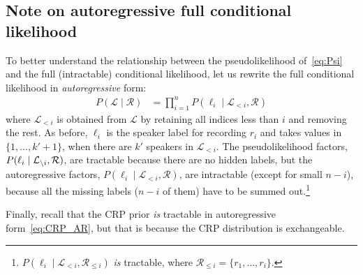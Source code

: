 \documentclass[a4paper,oneside,12pt,english]{report}
\def\Lset{\mathcal{L}}
\def\Rset{\mathcal{R}}
\begin{document}
\subsection{Note on autoregressive full conditional likelihood}
To better understand the relationship between the pseudolikelihood of~\eqref{eq:Psi} and the full (intractable) conditional likelihood, let us rewrite the full conditional likelihood in \emph{autoregressive} form:
\begin{align}
P(\Lset \mid \Rset) &= \prod_{i=1}^{n} P(\ell_i\mid\Lset_{< i},\Rset)
\end{align} 
where $\Lset_{< i}$ is obtained from $\Lset$ by retaining all indices less than $i$ and removing the rest. As before, $\ell_i$ is the speaker label for recording $r_i$ and takes values in $\{1,\ldots,k'+1\}$, when there are $k'$ speakers in $\Lset_{< i}$. The pseudolikelihood factors, $P(\ell_i\mid\Li,\Rset)$, are tractable because there are no hidden labels, but the autoregressive factors, $P(\ell_i\mid\Lset_{< i},\Rset)$, are intractable (except for small $n-i$), because all the missing labels ($n-i$ of them) have to be summed out.\footnote{$P(\ell_i\mid\Lset_{<i},\Rset_{\le i})$ \emph{is} tractable, where $\Rset_{\le i}=\{r_1,\ldots,r_i\}$.}

Finally, recall that the CRP prior \emph{is} tractable in autoregressive form~\eqref{eq:CRP_AR}, but that is because the CRP distribution is exchangeable.
\end{document}
